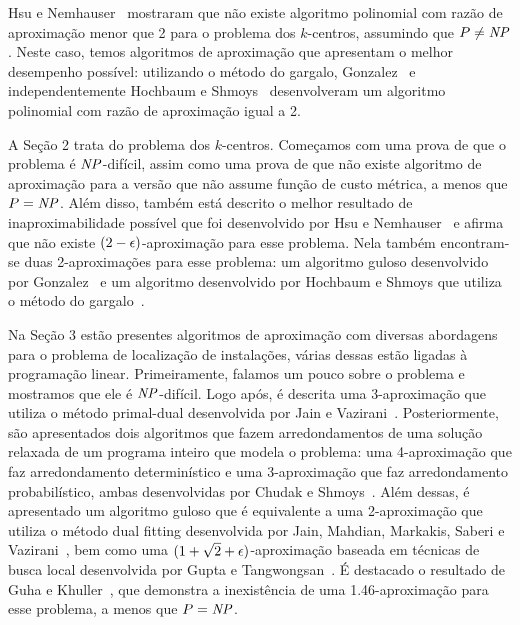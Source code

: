 \documentclass[12pt]{article}
\begin{document}
Hsu e Nemhauser~\cite{HSU1979209} mostraram que não existe algoritmo polinomial com razão de aproximação menor que 2 para o problema dos $k$-centros, assumindo que $P\neq\mathit{NP}$. Neste caso, temos algoritmos de aproximação que apresentam o melhor desempenho possível: utilizando o método do gargalo, Gonzalez~\cite{GONZALEZ1985293} e independentemente Hochbaum e Shmoys~\cite{HochShmoys'85} desenvolveram um algoritmo polinomial com razão de aproximação igual a 2.

A Seção 2 trata do problema dos $k$-centros. Começamos com uma prova de que o problema é $\mathit{NP}$-difícil, assim como uma prova de que não existe algoritmo de aproximação para a versão que não assume função de custo métrica, a menos que $P = \mathit{NP}$. Além disso, também está descrito o melhor resultado de inaproximabilidade possível que foi desenvolvido por Hsu e Nemhauser~\cite{HSU1979209} e afirma que não existe $(2-\epsilon)$-aproximação para esse problema. Nela também encontram-se duas 2-aproximações para esse problema: um algoritmo guloso desenvolvido por Gonzalez~\cite{GONZALEZ1985293} e um algoritmo desenvolvido por Hochbaum e Shmoys que utiliza o método do gargalo~\cite{HSBottle}.


Na Seção 3 estão presentes algoritmos de aproximação com diversas abordagens para o problema de localização de instalações, várias dessas estão ligadas à programação linear. Primeiramente, falamos um pouco sobre o problema e mostramos que ele é $\mathit{NP}$-difícil. Logo após, é descrita uma 3-aproximação que utiliza o método primal-dual desenvolvida por Jain e Vazirani~\cite{JV}. Posteriormente, são apresentados dois algoritmos que fazem arredondamentos de uma solução relaxada de um programa inteiro que modela o problema: uma 4-aproximação que faz arredondamento determinístico e uma 3-aproximação que faz arredondamento probabilístico, ambas desenvolvidas por Chudak e Shmoys~\cite{Chudak2003}. Além dessas, é apresentado um algoritmo guloso que é equivalente a uma 2-aproximação que utiliza o método dual fitting desenvolvida por Jain, Mahdian, Markakis, Saberi e Vazirani~\cite{jain2002greedy}, bem como uma $(1 + \sqrt{2} + \epsilon)$-aproximação baseada em técnicas de busca local desenvolvida por Gupta e Tangwongsan~\cite{DBLP:journals/corr/abs-0809-2554}. É destacado o resultado de Guha e Khuller~\cite{GUHA1999228}, que demonstra a inexistência de uma 1.46-aproximação para esse problema, a menos que $P=\mathit{NP}$.
\end{document}
